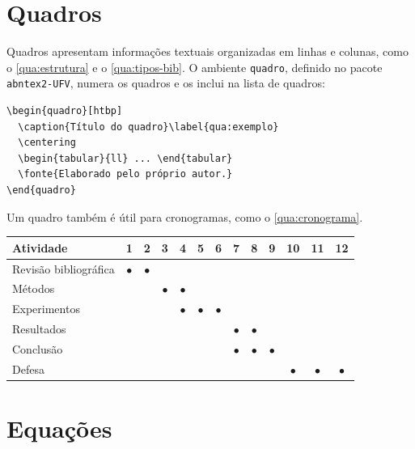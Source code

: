 \section{Quadros}\label{sec:quadros}

Quadros apresentam informações textuais organizadas em linhas e colunas, como o \autoref{qua:estrutura} e o \autoref{qua:tipos-bib}. O ambiente \texttt{quadro}, definido no pacote \texttt{abntex2-UFV}, numera os quadros e os inclui na lista de quadros:

\begin{verbatim}
\begin{quadro}[htbp]
  \caption{Título do quadro}\label{qua:exemplo}
  \centering
  \begin{tabular}{ll} ... \end{tabular}
  \fonte{Elaborado pelo próprio autor.}
\end{quadro}
\end{verbatim}

Um quadro também é útil para cronogramas, como o \autoref{qua:cronograma}.

\begin{quadro}[htbp]
	\caption{Cronograma do trabalho, em meses}\label{qua:cronograma}
	\centering
	\footnotesize
	\begin{tabular}{lcccccccccccc}
		\toprule
		\textbf{Atividade} & \textbf{1} & \textbf{2} & \textbf{3} & \textbf{4} & \textbf{5} & \textbf{6} & \textbf{7} & \textbf{8} & \textbf{9} & \textbf{10} & \textbf{11} & \textbf{12} \\
		\midrule
		Revisão bibliográfica & $\bullet$ & $\bullet$ & & & & & & & & & & \\
		Métodos & & & $\bullet$ & $\bullet$ & & & & & & & & \\
		Experimentos & & & & $\bullet$ & $\bullet$ & $\bullet$ & & & & & & \\
		Resultados & & & & & & & $\bullet$ & $\bullet$ & & & & \\
		Conclusão & & & & & & & $\bullet$ & $\bullet$ & $\bullet$ & & & \\
		Defesa & & & & & & & & & & $\bullet$ & $\bullet$ & $\bullet$ \\
		\bottomrule
	\end{tabular}
\end{quadro}

\section{Equações}\label{sec:equacoes}

